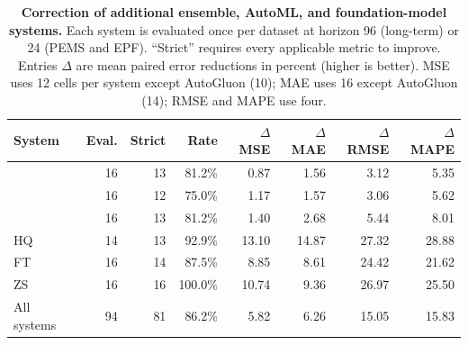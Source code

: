 \begin{table}[h!]
\centering
\small
\setlength{\tabcolsep}{4pt}
\caption{\textbf{Correction of additional ensemble, AutoML, and foundation-model systems.} Each system is evaluated once per dataset at horizon 96 (long-term) or 24 (PEMS and EPF). ``Strict'' requires every applicable metric to improve. Entries $\Delta$ are mean paired error reductions in percent (higher is better). MSE uses 12 cells per system except AutoGluon (10); MAE uses 16 except AutoGluon (14); RMSE and MAPE use four.}
\label{tab:strong-systems}
\begin{tabular}{lrrrrrrr}
\toprule
System & Eval. & Strict & Rate & $\Delta$MSE & $\Delta$MAE & $\Delta$RMSE & $\Delta$MAPE\\
\midrule
\forwardsel{} & 16 & 13 & 81.2\% & 0.87 & 1.56 & 3.12 & 5.35\\
\portfolioens{} & 16 & 12 & 75.0\% & 1.17 & 1.57 & 3.06 & 5.62\\
\zeroshotens{} & 16 & 13 & 81.2\% & 1.40 & 2.68 & 5.44 & 8.01\\
\autogluon{} HQ & 14 & 13 & 92.9\% & 13.10 & 14.87 & 27.32 & 28.88\\
\chronosbolt{} FT & 16 & 14 & 87.5\% & 8.85 & 8.61 & 24.42 & 21.62\\
\chronosbolt{} ZS & 16 & 16 & 100.0\% & 10.74 & 9.36 & 26.97 & 25.50\\
\midrule
All systems & 94 & 81 & 86.2\% & 5.82 & 6.26 & 15.05 & 15.83\\
\bottomrule
\end{tabular}
\end{table}
